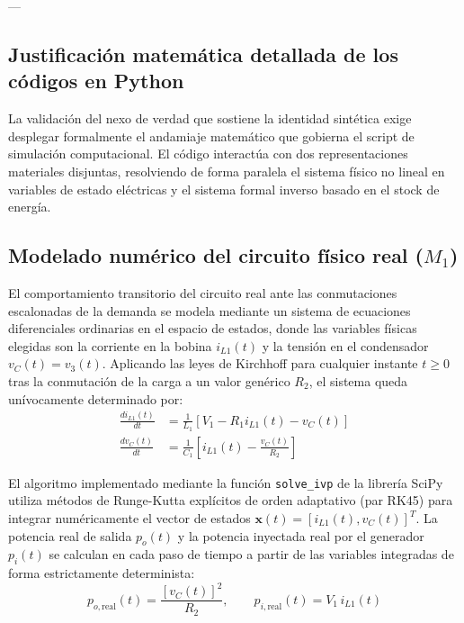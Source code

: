 \documentclass[11pt, a4paper]{article}
\theoremstyle{definition}
\theoremstyle{plain}
\theoremstyle{plain}
\theoremstyle{remark}
\theoremstyle{remark}
\theoremstyle{remark}
\begin{document}
---
\subsection{Justificación matemática detallada de los códigos en Python}
\label{sec:justificacion_matematica}

La validación del nexo de verdad que sostiene la identidad sintética exige desplegar formalmente el andamiaje matemático que gobierna el script de simulación computacional. El código interactúa con dos representaciones materiales disjuntas, resolviendo de forma paralela el sistema físico no lineal en variables de estado eléctricas y el sistema formal inverso basado en el stock de energía.

\subsection{Modelado numérico del circuito físico real ($M_1$)}
El comportamiento transitorio del circuito real ante las conmutaciones escalonadas de la demanda se modela mediante un sistema de ecuaciones diferenciales ordinarias en el espacio de estados, donde las variables físicas elegidas son la corriente en la bobina $i_{L1}(t)$ y la tensión en el condensador $v_C(t) = v_3(t)$. Aplicando las leyes de Kirchhoff para cualquier instante $t \ge 0$ tras la conmutación de la carga a un valor genérico $R_2$, el sistema queda unívocamente determinado por:
\begin{subequations}
	\label{eq:estado_rlc}
	\begin{align}
		\frac{di_{L1}(t)}{dt} &= \frac{1}{L_1} \left[ V_1 - R_1 i_{L1}(t) - v_C(t) \right] \\
		\frac{dv_C(t)}{dt} &= \frac{1}{C_1} \left[ i_{L1}(t) - \frac{v_C(t)}{R_2} \right]
	\end{align}
\end{subequations}

El algoritmo implementado mediante la función \texttt{solve\_ivp} de la librería SciPy utiliza métodos de Runge-Kutta explícitos de orden adaptativo (par RK45) para integrar numéricamente el vector de estados $\mathbf{x}(t) = [i_{L1}(t), v_C(t)]^T$. La potencia real de salida $p_o(t)$ y la potencia inyectada real por el generador $p_i(t)$ se calculan en cada paso de tiempo a partir de las variables integradas de forma estrictamente determinista:
\begin{equation}
	p_{o,\text{real}}(t) = \frac{[v_C(t)]^2}{R_2}, \qquad p_{i,\text{real}}(t) = V_1 \,  i_{L1}(t)
\end{equation}
\end{document}
